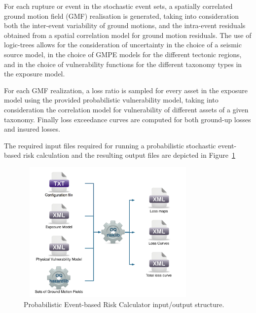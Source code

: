 For each rupture or event in the stochastic event sets, a spatially correlated
ground motion field (GMF) realisation is generated, taking into consideration
both the inter-event variability of ground motions, and the intra-event
residuals obtained from a spatial correlation model for ground motion
residuals. The use of logic-trees allows for the consideration of uncertainty
in the choice of a seismic source model, in the choice of GMPE models for the
different tectonic regions, and in the choice of vulnerability functions for
the different taxonomy types in the exposure model.

For each GMF realization, a loss ratio is sampled for every asset in the
exposure model using the provided probabilistic vulnerability model, taking
into consideration the correlation model for vulnerability of different assets
of a given taxonomy. Finally loss exceedance curves are computed for both
ground-up losses and insured losses.

The required input files required for running a probabilistic stochastic
event-based risk calculation and the resulting output files are depicted in
Figure~\ref{fig:io-structure-event-based-risk}

\begin{figure}[ht]
\centering
\includegraphics[width=9cm,height=7cm]{figures/risk/io-structure-event-based-risk.pdf}
\caption{Probabilistic Event-based Risk Calculator input/output structure.}
\label{fig:io-structure-event-based-risk}
\end{figure}
